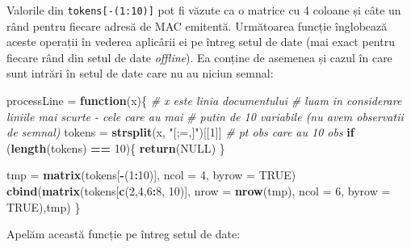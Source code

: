 \documentclass[]{article}
\newenvironment{Shaded}{\begin{snugshade}}{\end{snugshade}}
\newcommand{\KeywordTok}[1]{\textcolor[rgb]{0.13,0.29,0.53}{\textbf{#1}}}
\newcommand{\DataTypeTok}[1]{\textcolor[rgb]{0.13,0.29,0.53}{#1}}
\newcommand{\DecValTok}[1]{\textcolor[rgb]{0.00,0.00,0.81}{#1}}
\newcommand{\StringTok}[1]{\textcolor[rgb]{0.31,0.60,0.02}{#1}}
\newcommand{\CommentTok}[1]{\textcolor[rgb]{0.56,0.35,0.01}{\textit{#1}}}
\newcommand{\OtherTok}[1]{\textcolor[rgb]{0.56,0.35,0.01}{#1}}
\newcommand{\ControlFlowTok}[1]{\textcolor[rgb]{0.13,0.29,0.53}{\textbf{#1}}}
\newcommand{\OperatorTok}[1]{\textcolor[rgb]{0.81,0.36,0.00}{\textbf{#1}}}
\newcommand{\NormalTok}[1]{#1}
\begin{document}
Valorile din \texttt{tokens{[}-(1:10){]}} pot fi văzute ca o matrice cu
4 coloane și câte un rând pentru fiecare adresă de MAC emitentă.
Următoarea funcție înglobează aceste operații în vederea aplicârii ei pe
întreg setul de date (mai exact pentru fiecare rând din setul de date
\emph{offline}). Ea conține de asemenea și cazul în care sunt intrări în
setul de date care nu au niciun semnal:

\begin{Shaded}
\begin{Highlighting}[]
\NormalTok{processLine =}\StringTok{ }\ControlFlowTok{function}\NormalTok{(x)\{}
  \CommentTok{# x este linia documentului }
  \CommentTok{# luam in considerare liniile mai scurte - cele care au mai }
  \CommentTok{# putin de 10 variabile (nu avem observatii de semnal)}
\NormalTok{  tokens =}\StringTok{ }\KeywordTok{strsplit}\NormalTok{(x, }\StringTok{"[;=,]"}\NormalTok{)[[}\DecValTok{1}\NormalTok{]]}
  \CommentTok{# pt obs care au 10 obs}
  \ControlFlowTok{if}\NormalTok{ (}\KeywordTok{length}\NormalTok{(tokens) }\OperatorTok{==}\StringTok{ }\DecValTok{10}\NormalTok{)\{}
    \KeywordTok{return}\NormalTok{(}\OtherTok{NULL}\NormalTok{)}
\NormalTok{  \}}
  
\NormalTok{  tmp =}\StringTok{ }\KeywordTok{matrix}\NormalTok{(tokens[}\OperatorTok{-}\NormalTok{(}\DecValTok{1}\OperatorTok{:}\DecValTok{10}\NormalTok{)], }\DataTypeTok{ncol =} \DecValTok{4}\NormalTok{, }\DataTypeTok{byrow =} \OtherTok{TRUE}\NormalTok{)}
  \KeywordTok{cbind}\NormalTok{(}\KeywordTok{matrix}\NormalTok{(tokens[}\KeywordTok{c}\NormalTok{(}\DecValTok{2}\NormalTok{,}\DecValTok{4}\NormalTok{,}\DecValTok{6}\OperatorTok{:}\DecValTok{8}\NormalTok{, }\DecValTok{10}\NormalTok{)], }
               \DataTypeTok{nrow =} \KeywordTok{nrow}\NormalTok{(tmp), }\DataTypeTok{ncol =} \DecValTok{6}\NormalTok{, }\DataTypeTok{byrow =} \OtherTok{TRUE}\NormalTok{),tmp)}
\NormalTok{\}}
\end{Highlighting}
\end{Shaded}

Apelăm această funcție pe întreg setul de date:
\end{document}
